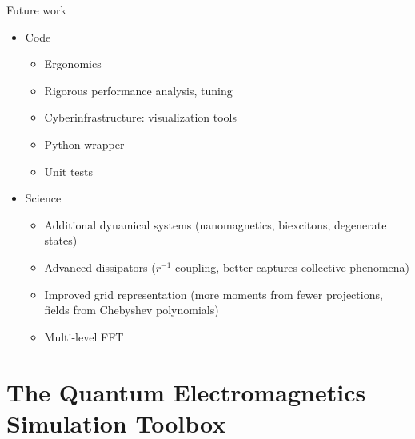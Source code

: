 \documentclass[aspectratio=169, usenames, dvipsnames]{beamer}
\begin{document}
\begin{frame}{Future work}
  \begin{itemize}
    \item[] Code
      \begin{itemize}
        \item Ergonomics
        \item Rigorous performance analysis, tuning
        \item Cyberinfrastructure: visualization tools
        \item Python wrapper
        \item Unit tests
      \end{itemize}

    \item[] Science
      \begin{itemize}
        \item Additional dynamical systems (nanomagnetics, biexcitons, degenerate states)
        \item Advanced dissipators ($r^{-1}$ coupling, better captures collective phenomena)
        \item Improved grid representation (more moments from fewer projections, fields from Chebyshev polynomials)
        \item Multi-level FFT
      \end{itemize}
  \end{itemize}
\end{frame}

\section{The \textcolor{BrickRed}{Qu}antum \textcolor{BrickRed}{E}lectromagnetics \textcolor{BrickRed}{S}imulation \textcolor{BrickRed}{T}oolbox}
\end{document}
